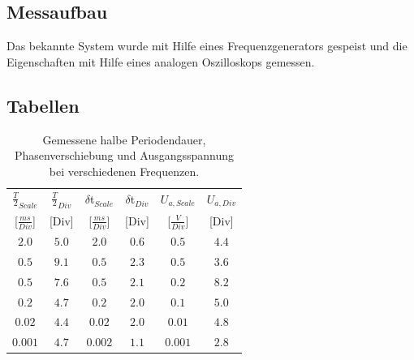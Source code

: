 \documentclass[12pt,a4paper,ngerman]{article}
\begin{document}
\subsection{Messaufbau}
Das bekannte System wurde mit Hilfe eines Frequenzgenerators gespeist und die Eigenschaften mit Hilfe eines analogen Oszilloskops gemessen.

\subsection{Tabellen}
\begin{table}[H]
\begin{center}
\begin{tabular}{ |c|c||c|c||c|c| }
  \hline
    $\frac{T}{2}_{Scale}$ & $\frac{T}{2}_{Div}$ & $\delta$t$_{Scale}$ & $\delta$t$_{Div}$ & $U_{a,Scale}$ & $U_{a,Div}$\\

    [$\frac{ms}{Div}$] & [Div] & [$\frac{ms}{Div}$] & [Div] & [$\frac{V}{Div}$] & [Div]\\
  \hline
$2.0$ & $5.0$ & $2.0$ & $0.6$ & $0.5$ & $4.4$ \\
  \hline
$0.5$ & $9.1$ & $0.5$ & $2.3$ & $0.5$ & $3.6$ \\
  \hline
$0.5$ & $7.6$ & $0.5$ & $2.1$ & $0.2$ & $8.2$ \\
  \hline
$0.2$ & $4.7$ & $0.2$ & $2.0$ & $0.1$ & $5.0$ \\
  \hline
$0.02$ & $4.4$ & $0.02$ & $2.0$ & $0.01$ & $4.8$ \\
  \hline
$0.001$ & $4.7$ & $0.002$ & $1.1$ & $0.001$ & $2.8$ \\
  \hline
\end{tabular}
\caption{Gemessene halbe Periodendauer, Phasenverschiebung und Ausgangsspannung bei verschiedenen Frequenzen.}
\end{center}
\label{tab:2}
\end{table}
\end{document}
